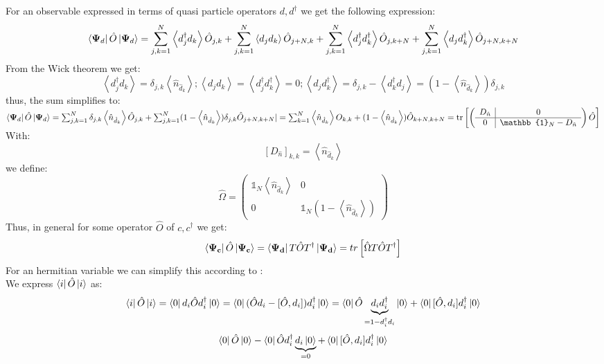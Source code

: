 \documentclass[Master]{subfiles}
\begin{document}
For an observable expressed in terms of quasi particle operators $d, d^{\dag}$ we get the following expression:
$$
\bra{\mathbf{\Psi}_d}\hat{O}
\ket{\mathbf{\Psi}_d}
= \sum_{j,k = 1}^N \left<d_j^{\dag}d_k\right> \hat{O}_{j,k} 
+ \sum_{j,k = 1}^N \left<d_j d_k\right> \hat{O}_{j+N,k}
+ \sum_{j,k = 1}^N \left<d_j^{\dag}d_k^{\dag}\right> \hat{O}_{j,k+N}
+ \sum_{j,k = 1}^N \left<d_j d_k^{\dag}\right> \hat{O}_{j+N,k+N}
$$
From the Wick theorem we get:
$$\left<d_j^{\dag}d_k\right> = \delta_{j,k}\left<\hat{n}_{\hat{d}_k}\right> ; \left<d_j d_k\right> = \left<d_j^{\dag}d_k^{\dag}\right> = 0; \left<d_j d_k^{\dag}\right> = \delta_{j,k} -\left<d_k^{\dag}d_j\right> = (1 - \left<\hat{n}_{\hat{d}_k}\right>)\delta_{j,k}$$
thus, the sum simplifies to:\\
\begin{math}
\centering
\bra{\vec{\Psi}_d}\hat{O}
\ket{\vec{\Psi}_d} = 
\sum_{j,k = 1}^N \delta_{j,k}\left<\hat{n}_{\hat{d}_k}\right>\hat{O}_{j,k} + \sum_{j,k = 1}^N (1 - \left<\hat{n}_{\hat{d}_k}\right>)\delta_{j,k} \hat{O}_{j+N,k+N}|= 
\sum_{k = 1}^N \left<\hat{n}_{\hat{d}_k}\right>O_{k,k}+ (1 - \left<\hat{n}_{\hat{d}_k}\right>) \hat{O}_{k+N,k+N}
= \tr\left[\left(
\begin{array}{c|c}
  D_{\hat{n}} &  0 \\
   \hline 
   0 & \mathbb{1}_N - D_{\hat{n}} 
\end{array}\right)\hat{O}\right]
\end{math}\\
With:
$$ [D_{\hat{n}} ]_{k,k} = \left<\hat{n}_{\hat{d}_k}\right> $$
we define:
$$ \hat{\Omega} = \left(
\begin{array}{c|c}
   \mathbb{1}_N \left<\hat{n}_{\hat{d}_k}\right>  &  0 \\
   \hline 
   0 & \mathbb{1}_N (1-\left<\hat{n}_{\hat{d}_k}\right>)
\end{array}\right) $$
Thus, in general for some operator $\hat{O}$ of $c, c^{\dag}$ we get:
$$
\bra{\mathbf{\Psi_c}}\hat{O}\ket{\mathbf{\Psi_c}} = \bra{\mathbf{\Psi_d}}T\hat{O}T^{\dag}\ket{\mathbf{\Psi_d}} =
tr\left[\hat{\Omega} T\hat{O}T^{\dag} \right]
$$
For an hermitian variable we can simplify this according to :\\
We express $\bra{i}\hat{O}\ket{i}$ as:
$$
\bra{i}\hat{O}\ket{i} = \bra{0}d_i\hat{O}d^{\dag}_i\ket{0} = \bra{0} (\hat{O}d_i -[\hat{O},d_i]) d^{\dag}_i\ket{0} = 
\bra{0} \hat{O} \underbrace{d_i d^{\dag}_i}_{= 1- d^{\dag}_i d_i}\ket{0} +\bra{0} [\hat{O},d_i] d^{\dag}_i\ket{0}
$$
$$
\bra{0} \hat{O} \ket{0} - \bra{0} \hat{O} d^{\dag}_i \underbrace{d_i\ket{0}}_{=0}  +\bra{0} [\hat{O},d_i] d^{\dag}_i\ket{0}
$$
\end{document}
